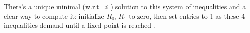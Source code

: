 






There's a unique minimal (w.r.t $\preceq$) solution to this system of inequalities and a clear way to compute it: initialize $R_0$, $R_1$ to zero,
then set entries to 1 as these 4 inequalities demand until a fixed point is reached .


